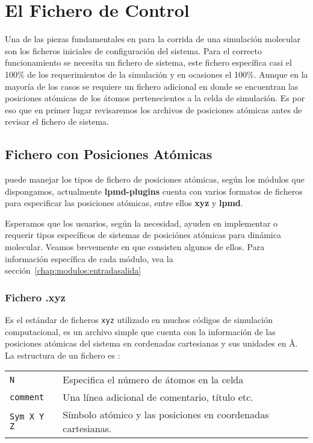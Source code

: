 \chapter{El Fichero de Control}
\label{chap:input}

Una de las piezas fundamentales en \lpmd para la corrida de una simulaci\'on molecular son los ficheros iniciales de configuraci\'on del sistema. Para el correcto funcionamiento se necesita un fichero de sistema, este fichero espec\'ifica casi el 100\% de los requerimientos de la simulaci\'on y en ocasiones el 100\%. Aunque en la mayor\'ia de los casos se requiere un fichero adicional en donde se encuentran las posiciones at\'omicas de los \'atomos pertenecientes a la celda de simulaci\'on. Es por eso que en primer lugar revisaremos los archivos de posiciones at\'omicas antes de revisar el fichero de sistema.

\section{Fichero con Posiciones At\'omicas}

\lpmd puede manejar los tipos de fichero de posiciones at\'omicas, seg\'un los m\'odulos que dispongamos, actualmente \textbf{lpmd-plugins} cuenta con varios formatos de ficheros para especificar las posiciones at\'omicas, entre ellos \textbf{xyz} y \textbf{lpmd}.

Esperamos que los usuarios, seg\'un la necesidad, ayuden en implementar o requerir tipos espec\'ificos de sistemas de posici\'ones at\'omicas para din\'amica molecular. Veamos brevemente en que consisten algunos de ellos. Para informaci\'on espec\'ifica de cada m\'odulo, vea la secci\'on~\ref{chap:modulos:entradasalida}

\subsection{Fichero .xyz}

Es el est\'andar de ficheros \verb|xyz| utilizado en muchos c\'odigos de simulaci\'on computacional, es un archivo simple que cuenta con la informaci\'on de las posiciones at\'omicas del sistema en cordenadas cartesianas y sus unidades en \AA. La estructura de un fichero es :
\begin{center}
\begin{tabular}{l|l}
 \verb|N| & Especifica el n\'umero de \'atomos en la celda \\
 \verb|comment| & Una l\'inea adicional de comentario, t\'itulo etc. \\
 \verb|Sym X Y Z| & S\'imbolo at\'omico y las posiciones en coordenadas cartesianas. \\
\end{tabular}
\end{center}

